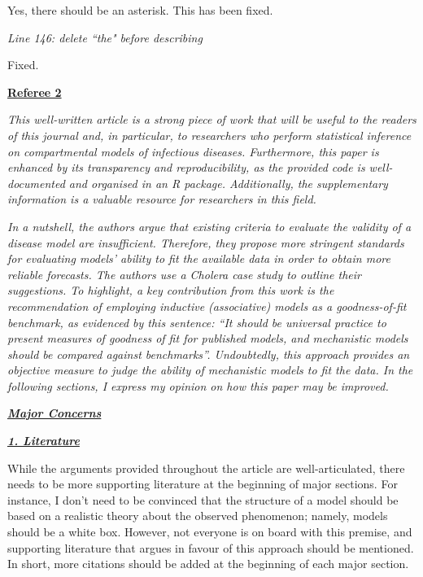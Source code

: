 \documentclass[11pt]{article}
\newcommand\report[1]{{\color{mygreen} \vspace{1mm}\hspace{0.25in}\parbox{6in}{\em #1}}}
\begin{document}
Yes, there should be an asterisk. This has been fixed.

\report{
  Line 146: delete ``the" before describing
}

Fixed.

\newpage


\begin{center}
{\large{\textbf{\underline{Referee 2}}}} %
\end{center}


\report{
  This well-written article is a strong piece of work that will be useful to the readers of this journal and, in particular, to researchers who perform statistical inference on compartmental models of infectious diseases. Furthermore, this paper is enhanced by its transparency and reproducibility, as the provided code is well-documented and organised in an R package. Additionally, the supplementary information is a valuable resource for researchers in this field.
}

\report{
  In a nutshell, the authors argue that existing criteria to evaluate the validity of a disease model are insufficient. Therefore, they propose more stringent standards for evaluating models’ ability to fit the available data in order to obtain more reliable forecasts. The authors use a Cholera case study to outline their suggestions. To highlight, a key contribution from this work is the recommendation of employing inductive (associative) models as a goodness-of-fit benchmark, as evidenced by this sentence: “It should be universal practice to present measures of goodness of fit for published models, and mechanistic models should be compared against benchmarks”. Undoubtedly, this approach provides an objective measure to judge the ability of mechanistic models to fit the data. In the following sections, I express my opinion on how this paper may be improved.
}

\report{
\textbf{\underline{Major Concerns}}
}

\report{
  \textbf{\underline{1. Literature}}

While the arguments provided throughout the article are well-articulated, there needs to be more supporting literature at the beginning of major sections. For instance, I don’t need to be convinced that the structure of a model should be based on a realistic theory about the observed phenomenon; namely, models should be a white box. However, not everyone is on board with this premise, and supporting literature that argues in favour of this approach should be mentioned. In short, more citations should be added at the beginning of each major section.
}
\end{document}
